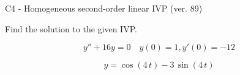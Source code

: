 \begin{exercise}
  \begin{exerciseTitle}C4 - Homogeneous second-order linear IVP (ver. 89)\end{exerciseTitle}
  \begin{exerciseStatement}
    
Find the solution to the given IVP.

    
\[y''+16y = 0 \hspace{1em} y(0) = 1 , y'(0) = -12\]

  \end{exerciseStatement}
  \begin{exerciseAnswer}
    
\[y= \cos\left(4 \, t\right) - 3 \, \sin\left(4 \, t\right)\]

  \end{exerciseAnswer}
\end{exercise}